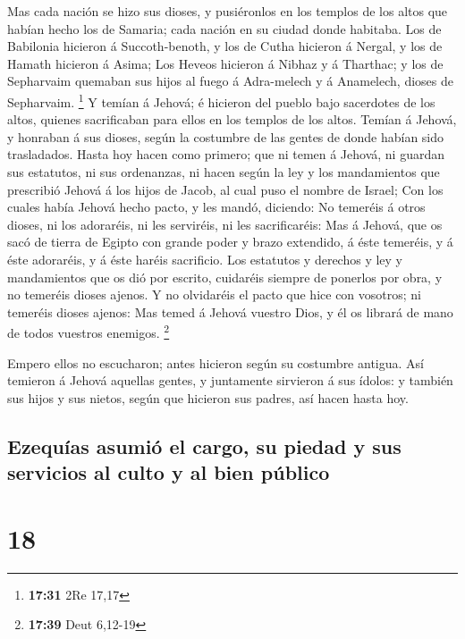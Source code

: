  Mas cada nación se hizo sus dioses, y pusiéronlos en los
templos de los altos que habían hecho los de Samaria; cada nación en su
ciudad donde habitaba.  Los de Babilonia hicieron á
Succoth-benoth, y los de Cutha hicieron á Nergal, y los de Hamath
hicieron á Asima;  Los Heveos hicieron á Nibhaz y á
Tharthac; y los de Sepharvaim quemaban sus hijos al fuego á Adra-melech
y á Anamelech, dioses de Sepharvaim. \footnote{\textbf{17:31} 2Re 17,17}
 Y temían á Jehová; é hicieron del pueblo bajo sacerdotes
de los altos, quienes sacrificaban para ellos en los templos de los
altos.  Temían á Jehová, y honraban á sus dioses, según
la costumbre de las gentes de donde habían sido trasladados.
 Hasta hoy hacen como primero; que ni temen á Jehová, ni
guardan sus estatutos, ni sus ordenanzas, ni hacen según la ley y los
mandamientos que prescribió Jehová á los hijos de Jacob, al cual puso el
nombre de Israel;  Con los cuales había Jehová hecho
pacto, y les mandó, diciendo: No temeréis á otros dioses, ni los
adoraréis, ni les serviréis, ni les sacrificaréis:  Mas á
Jehová, que os sacó de tierra de Egipto con grande poder y brazo
extendido, á éste temeréis, y á éste adoraréis, y á éste haréis
sacrificio.  Los estatutos y derechos y ley y
mandamientos que os dió por escrito, cuidaréis siempre de ponerlos por
obra, y no temeréis dioses ajenos.  Y no olvidaréis el
pacto que hice con vosotros; ni temeréis dioses ajenos: 
Mas temed á Jehová vuestro Dios, y él os librará de mano de todos
vuestros enemigos. \footnote{\textbf{17:39} Deut 6,12-19}

 Empero ellos no escucharon; antes hicieron según su
costumbre antigua.  Así temieron á Jehová aquellas
gentes, y juntamente sirvieron á sus ídolos: y también sus hijos y sus
nietos, según que hicieron sus padres, así hacen hasta hoy.

\hypertarget{ezequuxedas-asumiuxf3-el-cargo-su-piedad-y-sus-servicios-al-culto-y-al-bien-puxfablico}{%
\subsection{Ezequías asumió el cargo, su piedad y sus servicios al culto
y al bien
público}\label{ezequuxedas-asumiuxf3-el-cargo-su-piedad-y-sus-servicios-al-culto-y-al-bien-puxfablico}}

\hypertarget{section-17}{%
\section{18}\label{section-17}}

